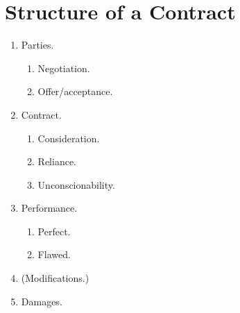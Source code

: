 \section{Structure of a Contract}

\begin{enumerate}
    \item Parties.
    \begin{enumerate}
        \item Negotiation.
        \item Offer/acceptance.
    \end{enumerate}
    \item Contract.
    \begin{enumerate}
        \item Consideration.
        \item Reliance.
        \item Unconscionability.
    \end{enumerate}
    \item Performance.
    \begin{enumerate}
        \item Perfect.
        \item Flawed.
    \end{enumerate}
    \item (Modifications.)
    \item Damages.
\end{enumerate}
